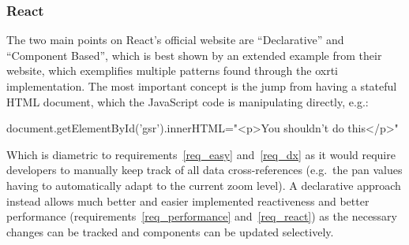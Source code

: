 \subsubsection*{React}
The two main points on React's official website are
  ``Declarative'' and ``Component Based''\cite*{noauthor_react_nodate}, which
  is best shown by an extended example from their website, which exemplifies
  multiple patterns found through the oxrti implementation. The most important
  concept is the jump from having a stateful HTML document, which the JavaScript
  code is manipulating directly, e.g.:
  \begin{typescript}
document.getElementById('gsr').innerHTML="<p>You shouldn't do this</p>"
\end{typescript}
Which is diametric to requirements~\ref{req_easy} and~\ref{req_dx} as it would
require developers to manually keep track of all data cross-references (e.g.\
the pan values having to automatically adapt to the current zoom level). A
declarative approach instead allows much better and easier implemented
reactiveness and better performance (requirements~\ref{req_performance}
and~\ref{req_react}) as the necessary changes can be tracked and components can be
updated selectively.

